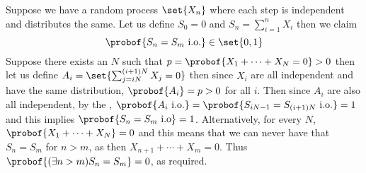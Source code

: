 \eexam

\bexam

    Suppose we have a random process $\set{X_n}$ where each step is independent and distributes the same.
    Let us define $S_0=0$ and $S_n=\sum_{i=1}^n X_i$ then we claim
    $$ \probof{S_n=S_m\hbox{ i.o.}} \in \set{0,1} $$
    Suppose there exists an $N$ such that $p=\probof{X_1+\cdots+X_N=0}>0$ then let us define $A_i=\set{\sum_{j=iN}^{(i+1)N}X_j=0}$ then since $X_i$ are all independent and have the same distribution,
    $\probof{A_i}=p>0$ for all $i$.
    Then since $A_i$ are also all independent, by the , $\probof{A_i\hbox{ i.o.}}=\probof{S_{iN-1}=S_{(i+1)N}\hbox{ i.o.}}=1$ and this implies $\probof{S_n=S_m\hbox{ i.o}}=1$.
    Alternatively, for every $N$, $\probof{X_1+\cdots+X_N}=0$ and this means that we can never have that $S_n=S_m$ for $n>m$, as then $X_{n+1}+\cdots+X_m=0$.
    Thus $\probof{(\exists n>m)S_n=S_m}=0$, as required.

\eexam

\bye

